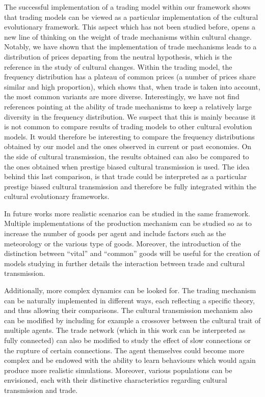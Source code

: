 \documentclass[a4paper]{article}
\begin{document}
The successful implementation of a trading model within our framework shows that trading models can be viewed as a particular implementation of the cultural evolutionary framework. This aspect which has not been studied before, opens a new line of thinking on the weight of trade mechanisms within cultural change. Notably, we have shown that the implementation of trade mechanisms leads to a distribution of prices departing from the neutral hypothesis, which is the reference in the study of cultural changes. Within the trading model, the frequency distribution has a plateau of common prices (a number of prices share similar and high proportion), which shows that, when trade is taken into account, the most common variants are more diverse. Interestingly, we have not find references pointing at the ability of trade mechanisms to keep a relatively large diversity in the frequency distribution. We suspect that this is mainly because it is not common to compare results of trading models to other cultural evolution models. It would therefore be interesting to compare the frequency distributions obtained by our model and the ones observed in current or past economies. On the side of cultural transmission, the results obtained can also be compared to the ones obtained when prestige biased cultural transmission is used. The idea behind this last comparison, is that trade could be interpreted as a particular prestige biased cultural transmission and therefore be fully integrated within the cultural evolutionary frameworks.

In future works more realistic scenarios can be studied in the same framework. Multiple implementations of the production mechanism can be studied so as to increase the number of goods per agent and include factors such as the meteorology or the various type of goods. Moreover, the introduction of the distinction between ``vital'' and ``common'' goods will be useful for the creation of models studying in further details the interaction between trade and cultural transmission. 

Additionally, more complex dynamics can be looked for. The trading mechanism can be naturally implemented in different ways, each reflecting a specific theory, and thus allowing their comparisons. The cultural transmission mechanism also can be modified by including for example a crossover between the cultural trait of multiple agents. The trade network (which in this work can be interpreted as fully connected) can also be modified to study the effect of slow connections or the rupture of certain connections. The agent themselves could become more complex and be endowed with the ability to learn behaviours which would again produce more realistic simulations. Moreover, various populations can be envisioned, each with their distinctive characteristics regarding cultural transmission and trade. 
\end{document}
